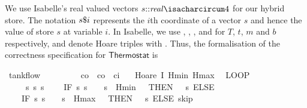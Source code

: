 \documentclass[envcountsame]{llncs}
\begin{document}
\begin{example}
We use Isabelle's real valued vectors $s{\isacharcolon}{\isacharcolon}\mathit{real}{\isacharcircum}4$ for our hybrid store. The notation $s{\emph{$\$$}}i$ represents the $i$th coordinate of a vector $s$ and
hence the value of store $s$ at variable $i$. In Isabelle, we use , , , and  for $T$, $t$, $m$ and $b$ respectively, and denote Hoare triples with . Thus, the formalisation of the correctness specification for $\mathsf{Thermostat}$ is
\begin{isabellebody}
\isanewline
{}\isamarkupfalse%
\ tank{\isacharunderscore}flow{\isacharcolon}\isanewline
\ \ \ {\isachardoublequoteopen}{}\ {\isasymle}\ {\isasymtau}{\isachardoublequoteclose}\ \ {\isachardoublequoteopen}{}\ {\isacharless}\ c\isactrlsub o{\isachardoublequoteclose}\ \ {\isachardoublequoteopen}c\isactrlsub o\ {\isacharless}\ c\isactrlsub i{\isachardoublequoteclose}\isanewline
\ \ \ {\isachardoublequoteopen}Hoare\ {\isasymlceil}I\ Hmin\ Hmax{\isasymrceil}\isanewline
\ \ {\isacharparenleft}LOOP\ \isanewline
\ \ \ \ %
\isanewline
\ \ \ \ {\isacharparenleft}{\isacharparenleft}{}\ {\isacharcolon}{\isacharcolon}{\isacharequal}{\isacharparenleft}{\isasymlambda}s{\isachardot}{}{\isacharparenright}{\isacharparenright}{\isacharsemicolon}{\isacharparenleft}{}\ {\isacharcolon}{\isacharcolon}{\isacharequal}{\isacharparenleft}{\isasymlambda}s{\isachardot}\ s{\isachardollar}{}{\isacharparenright}{\isacharparenright}{\isacharsemicolon}\isanewline
\ \ \ \ {\isacharparenleft}IF\ {\isacharparenleft}{\isasymlambda}s{\isachardot}\ s{\isachardollar}{}\ {\isacharequal}\ {}\ {\isasymand}\ s{\isachardollar}{}\ {\isasymle}\ Hmin\ {\isacharplus}\ {}{\isacharparenright}\ THEN\ {\isacharparenleft}{}\ {\isacharcolon}{\isacharcolon}{\isacharequal}\ {\isacharparenleft}{\isasymlambda}s{\isachardot}{}{\isacharparenright}{\isacharparenright}\ ELSE\ \isanewline
\ \ \ \ {\isacharparenleft}IF\ {\isacharparenleft}{\isasymlambda}s{\isachardot}\ s{\isachardollar}{}\ {\isacharequal}\ {}\ {\isasymand}\ s{\isachardollar}{}\ {\isasymge}\ Hmax\ {\isacharminus}\ {}{\isacharparenright}\ THEN\ {\isacharparenleft}{}\ {\isacharcolon}{\isacharcolon}{\isacharequal}\ {\isacharparenleft}{\isasymlambda}s{\isachardot}{}{\isacharparenright}{\isacharparenright}\ ELSE\ skip{\isacharparenright}{\isacharparenright}{\isacharsemicolon}\isanewline

\end{isabellebody}
\end{example}
\end{document}
